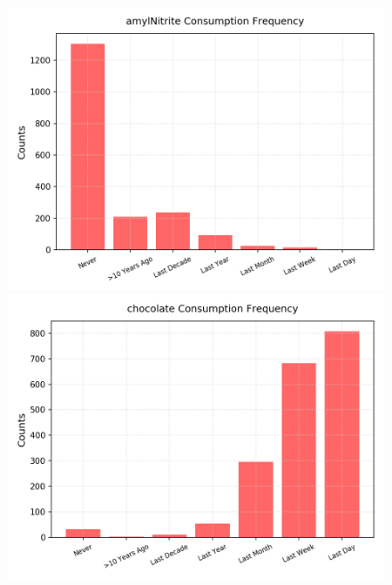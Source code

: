 \documentclass{article}
\begin{document}
\begin{figure}[h!]
\begin{minipage}[b]{0.32\textwidth}
	\end{minipage}
	\begin{minipage}[b]{0.32\textwidth}
		\includegraphics[width=\textwidth]{plots/drugsPlots/amylNitrite_freq.png}
	\end{minipage}
	\begin{minipage}[b]{0.32\textwidth}
	\includegraphics[width=\textwidth]{plots/drugsPlots/chocolate_freq.png}
	

\end{minipage}
\end{figure}
\end{document}
